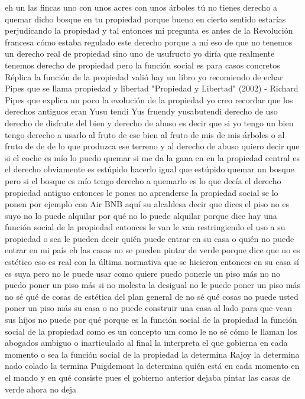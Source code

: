 eh un las fincas uno con unos acres con unos árboles tú no tienes derecho a quemar
dicho bosque en tu propiedad porque bueno en cierto sentido estarías perjudicando la propiedad y tal
entonces mi pregunta es antes de la Revolución francesa cómo estaba regulado este derecho
porque a mí eso de que no tenemos un derecho real de propiedad sino uno de usufructo
yo diría que realmente tenemos derecho de propiedad pero la función social es para casos concretos
Réplica
la función de la propiedad valió hay un libro yo recomiendo de echar Pipes que se llama propiedad y libertad
"Propiedad y Libertad" (2002) - Richard Pipes
que explica un poco la evolución de la propiedad yo creo recordar que los derechos antiguos eran Yusu tendi Yus fruendy yusabutendi
derecho de uso derecho de disfrute del bien y derecho de abuso es decir que si yo tengo un bien
tengo derecho a usarlo al fruto de ese bien al fruto de mis de mis árboles o al fruto de de de lo que produzca ese terreno
y al derecho de abuso quiero decir que si el coche es mío lo puedo quemar si me da la gana
en en la propiedad central es el derecho obviamente es estúpido hacerlo igual que estúpido quemar un bosque
pero si el bosque es mío tengo derecho a quemarlo es lo que decía el derecho propiedad antiguo entonces le pones no aprenderse la propiedad social
se lo ponen por ejemplo con Air BNB aquí su alcaldesa decir que dices el piso no es suyo no lo puede alquilar
por qué no lo puede alquilar porque dice hay una función social de la propiedad entonces le van le van restringiendo el uso a su propiedad
o sea le pueden decir quién puede entrar en su casa o quién no puede entrar en mi país eh las casas no se pueden pintar de verde
porque dice que no es estético eso es real con la última normativa que se hicieron entonces en su casa sí es suya pero no le puede usar como quiere
puedo ponerle un piso más no no puedo poner un piso más si no molesta la desigual no le puede poner un piso más no sé qué de cosas de estética
del plan general de no sé qué cosas no puede usted poner un piso más su casa o no puede construir una casa al lado para que vean sus hijos
no puede por qué porque es la función social de la propiedad la función social de la propiedad como es un concepto um como le no sé cómo le llaman los abogados
ambiguo o inarticulado al final la interpreta el que gobierna en cada momento
o sea la función social de la propiedad la determina Rajoy la determina nado colado la termina Puigdemont la determina
quién está en cada momento en el mando y en qué consiste pues el gobierno anterior dejaba pintar las casas de verde ahora no deja
